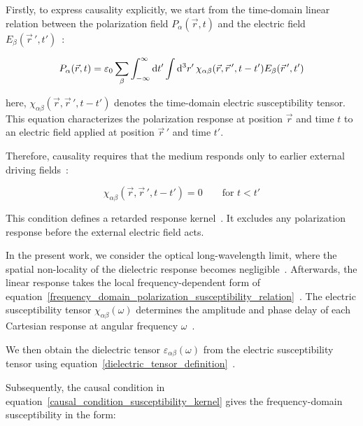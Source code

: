 Firstly, to express causality explicitly, 
we start from the time-domain linear relation between
the polarization field $P_{\alpha}(\vec{r},t)$ and
the electric field $E_{\beta}(\vec{r}\,',t')$~\cite{dressel2002electrodynamics}:

\begin{equation}
    P_{\alpha}(\vec{r},t) = 
    \varepsilon_0\sum_{\beta}\int_{-\infty}^{\infty}\mathrm{d}{t'}
    \int\mathrm{d}^3{r'}\,\chi_{\alpha\beta}(\vec{r},\vec{r}\,',t-t')
    E_{\beta}(\vec{r}\,',t')
\label{general_linear_response_polarization}
\end{equation}

here, $\chi_{\alpha\beta}(\vec{r},\vec{r}\,',t-t')$ denotes the time-domain electric susceptibility tensor.
This equation characterizes the polarization response at position $\vec{r}$ and time $t$ to an electric field applied at position $\vec{r}\,'$ and time $t'$.

Therefore, causality requires that the medium responds only to earlier external driving fields~\cite{stefanski2022analytical}:

\begin{equation}
    \chi_{\alpha\beta}(\vec{r},\vec{r}\,',t-t')=0
    \qquad \text{for $t<t'$}
\label{causal_condition_susceptibility_kernel}
\end{equation}

This condition defines a retarded response kernel~\cite{landau2013electrodynamics}.
It excludes any polarization response before the external electric field acts.

In the present work,
we consider the optical long-wavelength limit,
where the spatial non-locality of the dielectric response becomes negligible~\cite{agranovich2013crystal}.
Afterwards, the linear response takes the local frequency-dependent form of equation~\eqref{frequency_domain_polarization_susceptibility_relation}~\cite{franta2023dispersion}.
The electric susceptibility tensor $\chi_{\alpha\beta}(\omega)$ determines the amplitude and phase delay of each Cartesian response at angular frequency $\omega$~\cite{koutserimpas2024time}.

We then obtain the dielectric tensor $\varepsilon_{\alpha\beta}(\omega)$ from the electric susceptibility tensor using equation~\eqref{dielectric_tensor_definition}~\cite{franta2020symmetry}.

Subsequently, the causal condition in equation~\eqref{causal_condition_susceptibility_kernel}
gives the frequency-domain susceptibility in the form:

